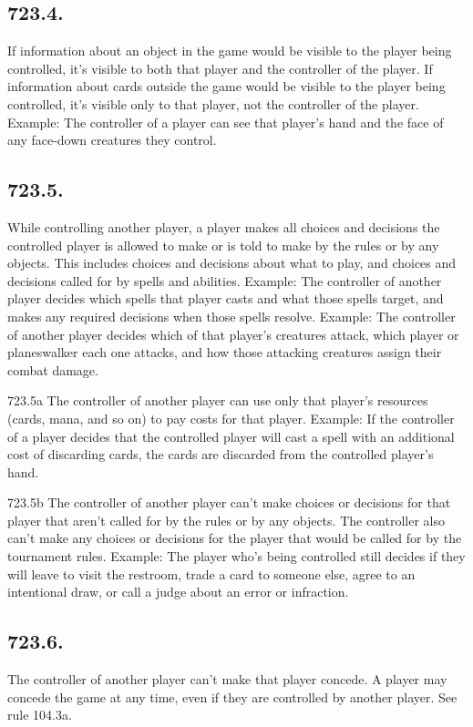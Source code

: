 \subsection*{723.4.}
If information about an object in the game would be visible to the player being controlled, it’s visible to both that player and the controller of the player. If information about cards outside the game would be visible to the player being controlled, it’s visible only to that player, not the controller of the player.
Example: The controller of a player can see that player’s hand and the face of any face-down creatures they control.

\subsection*{723.5.}
While controlling another player, a player makes all choices and decisions the controlled player is allowed to make or is told to make by the rules or by any objects. This includes choices and decisions about what to play, and choices and decisions called for by spells and abilities.
Example: The controller of another player decides which spells that player casts and what those spells target, and makes any required decisions when those spells resolve.
Example: The controller of another player decides which of that player’s creatures attack, which player or planeswalker each one attacks, and how those attacking creatures assign their combat damage.

723.5a The controller of another player can use only that player’s resources (cards, mana, and so on) to pay costs for that player.
Example: If the controller of a player decides that the controlled player will cast a spell with an additional cost of discarding cards, the cards are discarded from the controlled player’s hand.

723.5b The controller of another player can’t make choices or decisions for that player that aren’t called for by the rules or by any objects. The controller also can’t make any choices or decisions for the player that would be called for by the tournament rules.
Example: The player who’s being controlled still decides if they will leave to visit the restroom, trade a card to someone else, agree to an intentional draw, or call a judge about an error or infraction.

\subsection*{723.6.}
The controller of another player can’t make that player concede. A player may concede the game at any time, even if they are controlled by another player. See rule 104.3a.

